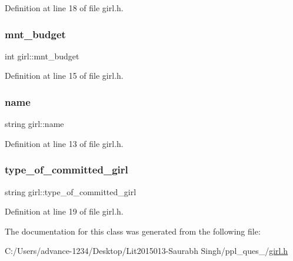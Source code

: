 Definition at line 18 of file girl.\+h.

\mbox{\label{classgirl_ab37511df32db77f4c7307311daa32b24}} 
\subsubsection{\texorpdfstring{mnt\+\_\+budget}{mnt\_budget}}
{\footnotesize\ttfamily int girl\+::mnt\+\_\+budget}



Definition at line 15 of file girl.\+h.

\mbox{\label{classgirl_a29a828b5fa3408535974cde15ccdd75b}} 
\subsubsection{\texorpdfstring{name}{name}}
{\footnotesize\ttfamily string girl\+::name}



Definition at line 13 of file girl.\+h.

\mbox{\label{classgirl_ae45fc5adc5b383a61a4f5728ac434174}} 
\subsubsection{\texorpdfstring{type\+\_\+of\+\_\+committed\+\_\+girl}{type\_of\_committed\_girl}}
{\footnotesize\ttfamily string girl\+::type\+\_\+of\+\_\+committed\+\_\+girl}



Definition at line 19 of file girl.\+h.



The documentation for this class was generated from the following file\+:\begin{DoxyCompactItemize}
\item 
C\+:/\+Users/advance-\/1234/\+Desktop/\+Lit2015013-\/\+Saurabh Singh/ppl\+\_\+ques\+\_/\hyperlink{girl_8h}{girl.\+h}\end{DoxyCompactItemize}

